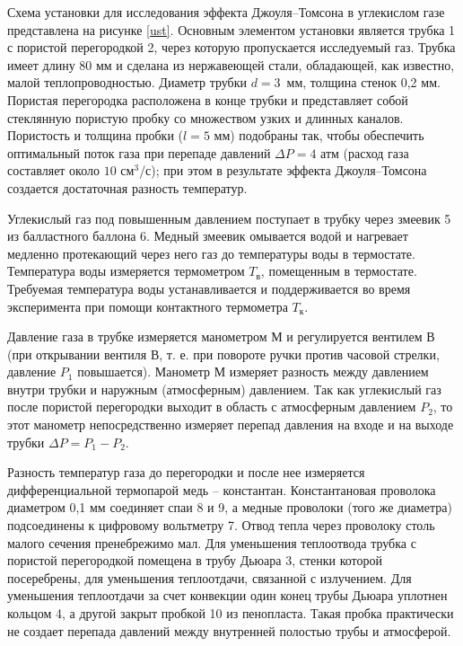 \documentclass[a4paper, 12pt]{article}
\begin{document}
	Схема установки для исследования эффекта Джоуля–Томсона в углекислом газе представлена на рисунке \ref{ust}. Основным элементом установки является трубка 1 с пористой перегородкой 2, через которую пропускается исследуемый газ. Трубка имеет длину 80 мм и сделана из нержавеющей стали, обладающей, как известно, малой теплопроводностью. Диаметр трубки $ d = 3 $~мм, толщина стенок 0,2 мм. Пористая перегородка расположена в конце трубки и представляет собой стеклянную пористую пробку со множеством узких и длинных каналов. Пористость и толщина пробки ($ l = 5 $ мм) подобраны так, чтобы обеспечить оптимальный поток газа при перепаде давлений $ \Delta P = 4 $ атм (расход газа составляет около $ 10 $ см$ ^3 $/с); при этом в результате эффекта Джоуля–Томсона создается достаточная разность температур.

	Углекислый газ под повышенным давлением поступает в трубку через змеевик 5 из балластного баллона 6. Медный змеевик омывается водой и нагревает медленно протекающий через него газ до температуры воды в термостате. Температура воды измеряется термометром $ T_\text{в} $, помещенным в термостате. Требуемая температура воды устанавливается и поддерживается во время эксперимента при помощи контактного термометра $ T_\text{к} $.
	
	Давление газа в трубке измеряется манометром М и регулируется вентилем В (при открывании вентиля В, т. е. при повороте ручки против часовой стрелки, давление $ P_1 $ повышается). Манометр М измеряет разность между давлением внутри трубки и наружным (атмосферным) давлением. Так как углекислый газ после пористой перегородки выходит в область с атмосферным давлением $ P_2 $, то этот манометр непосредственно измеряет перепад давления на входе и на выходе трубки $ \Delta P = P_1 - P_2 $.
	
	Разность температур газа до перегородки и после нее измеряется дифференциальной термопарой медь -- константан. Константановая проволока диаметром 0,1 мм соединяет спаи 8 и 9, а медные проволоки (того же диаметра) подсоединены к цифровому вольтметру 7. Отвод тепла через проволоку столь малого сечения пренебрежимо мал. Для уменьшения теплоотвода трубка с пористой перегородкой помещена в трубу Дьюара 3, стенки которой посеребрены, для уменьшения теплоотдачи, связанной с излучением. Для уменьшения теплоотдачи за счет конвекции один конец трубы Дьюара уплотнен кольцом 4, а другой закрыт пробкой 10 из пенопласта. Такая пробка практически не создает перепада давлений между внутренней полостью трубы и атмосферой.
	
\end{document}

